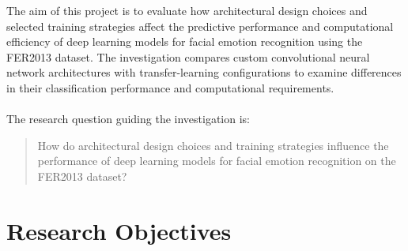 \documentclass[12pt, a4paper]{report}
\let\oldsection\section
\renewcommand{\section}{%
    \Needspace{6\baselineskip}%
    \oldsection
}
\begin{document}
			The aim of this project is to evaluate how architectural design choices and selected training strategies affect the predictive performance and computational efficiency of deep learning models for facial emotion recognition using the FER2013 dataset. The investigation compares custom convolutional neural network architectures with transfer-learning configurations to examine differences in their classification performance and computational requirements.\\\\
			The research question guiding the investigation is:\\
			\begin{quote}How do architectural design choices and training strategies influence the performance of deep learning models for facial emotion recognition on the FER2013 dataset?\end{quote}
			
		\section{Research Objectives}
			
\end{document}
